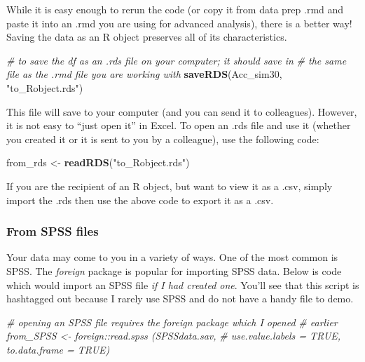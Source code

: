\documentclass[
  11pt,
]{book}
\newenvironment{Shaded}{\begin{snugshade}}{\end{snugshade}}
\newcommand{\CommentTok}[1]{\textcolor[rgb]{0.37,0.37,0.37}{\textit{#1}}}
\newcommand{\FunctionTok}[1]{\textcolor[rgb]{0.27,0.27,0.27}{\textbf{#1}}}
\newcommand{\NormalTok}[1]{#1}
\newcommand{\OtherTok}[1]{\textcolor[rgb]{0.37,0.37,0.37}{#1}}
\newcommand{\StringTok}[1]{\textcolor[rgb]{0.5,0.5,0.5}{#1}}
\begin{document}
While it is easy enough to rerun the code (or copy it from data prep .rmd and paste it into an .rmd you are using for advanced analysis), there is a better way! Saving the data as an R object preserves all of its characteristics.

\begin{Shaded}
\begin{Highlighting}[]
\CommentTok{\# to save the df as an .rds file on your computer; it should save in}
\CommentTok{\# the same file as the .rmd file you are working with}
\FunctionTok{saveRDS}\NormalTok{(Acc\_sim30, }\StringTok{"to\_Robject.rds"}\NormalTok{)}
\end{Highlighting}
\end{Shaded}

This file will save to your computer (and you can send it to colleagues). However, it is not easy to ``just open it'' in Excel. To open an .rds file and use it (whether you created it or it is sent to you by a colleague), use the following code:

\begin{Shaded}
\begin{Highlighting}[]
\NormalTok{from\_rds }\OtherTok{\textless{}{-}} \FunctionTok{readRDS}\NormalTok{(}\StringTok{"to\_Robject.rds"}\NormalTok{)}
\end{Highlighting}
\end{Shaded}

If you are the recipient of an R object, but want to view it as a .csv, simply import the .rds then use the above code to export it as a .csv.

\hypertarget{from-spss-files}{%
\subsubsection{From SPSS files}\label{from-spss-files}}

Your data may come to you in a variety of ways. One of the most common is SPSS. The \emph{foreign} package is popular for importing SPSS data. Below is code which would import an SPSS file \emph{if I had created one}. You'll see that this script is hashtagged out because I rarely use SPSS and do not have a handy file to demo.

\begin{Shaded}
\begin{Highlighting}[]
\CommentTok{\# opening an SPSS file requires the foreign package which I opened}
\CommentTok{\# earlier from\_SPSS \textless{}{-} foreign::read.spss (\textquotesingle{}SPSSdata.sav\textquotesingle{},}
\CommentTok{\# use.value.labels = TRUE, to.data.frame = TRUE)}
\end{Highlighting}
\end{Shaded}
\end{document}
